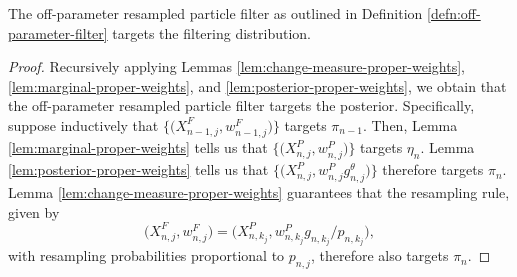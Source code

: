 \begin{thm}
    \label{thm:off-parameter-targeting}
    The off-parameter resampled particle filter as outlined in Definition \ref{defn:off-parameter-filter} targets the filtering distribution.
\end{thm}
\begin{proof}
    Recursively applying Lemmas \ref{lem:change-measure-proper-weights}, \ref{lem:marginal-proper-weights}, and \ref{lem:posterior-proper-weights}, we obtain that the off-parameter resampled particle filter targets the posterior.
    Specifically, suppose inductively that $\big\{\big(X^{F}_{n-1,j},w^{F}_{n-1,j}\big)\big\}$ targets $\pi_{n-1}$.
    Then, Lemma \ref{lem:marginal-proper-weights} tells us that $\big\{\big(X^{P}_{n,j},w^{P}_{n,j}\big)\big\}$ targets $\eta_n$.
    Lemma \ref{lem:posterior-proper-weights} tells us that $\big\{\big(X^{P}_{n,j},w^{P}_{n,j} g^\theta_{n,j} \big)\big\}$ therefore targets  $\pi_n$.
    Lemma \ref{lem:change-measure-proper-weights} guarantees that the resampling rule, given by 
    \[
    \big(X^{F}_{n,j},w^{F}_{n,j}\big) = \big(X^{P}_{n,k_j}, w^{P}_{n,k_j} g_{n,k_j}\big/ p_{n,k_j}\big),
    \]
    with resampling probabilities proportional to $p_{n,j}$, therefore also targets $\pi_n$.
\end{proof}

